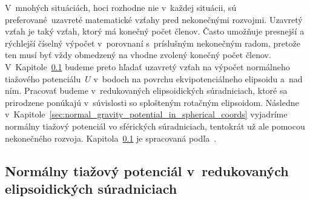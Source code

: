 \documentclass[a4paper,12pt]{book}
\begin{document}
V~mnohých situáciách, hoci rozhodne nie v~každej situácii, sú 
preferované~uzavreté matematické vzťahy pred nekonečnými rozvojmi.  Uzavretý 
vzťah je taký vzťah, ktorý má konečný počet členov.  Často umožňuje presnejší 
a rýchlejší číselný výpočet v~porovnaní s~príslušným nekonečným radom, pretože 
ten musí byť vždy obmedzený na vhodne zvolený konečný počet členov.  
V~Kapitole~\ref{sec:normal_gravity_potential_in_reduced_ell_coords} budeme 
preto hľadať uzavretý vzťah na výpočet normálneho tiažového potenciálu~$U$ 
v~bodoch na povrchu ekvipotenciálneho elipsoidu a~nad ním.  Pracovať budeme 
v~redukovaných elipsoidických súradniciach, ktoré sa prirodzene ponúkajú 
v~súvislosti so splošteným rotačným elipsoidom.  Následne 
v~Kapitole~\ref{sec:normal_gravity_potential_in_spherical_coords} vyjadríme 
normálny tiažový potenciál vo sférických súradniciach, tentokrát už ale pomocou 
nekonečného rozvoja.  
Kapitola~\ref{sec:normal_gravity_potential_in_reduced_ell_coords} je spracovaná 
podľa~\textcite{MoritzTheFigureOfTheEarth}.



\subsection{Normálny tiažový potenciál v~redukovaných elipsoidických 
súradniciach}
\label{sec:normal_gravity_potential_in_reduced_ell_coords}
\end{document}
